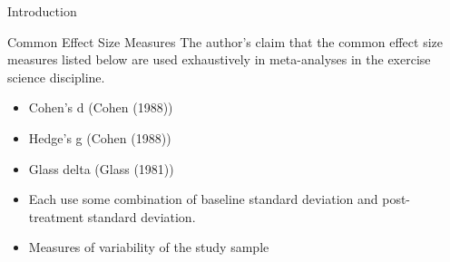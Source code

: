 \documentclass[
  ignorenonframetext,
  aspectratio=169,
]{beamer}
\begin{document}
\begin{frame}{Introduction}
\protect\hypertarget{introduction}{}
\begin{block}{Common Effect Size Measures}
\protect\hypertarget{common-effect-size-measures}{}
The author's claim that the common effect size measures listed below are
used exhaustively in meta-analyses in the exercise science discipline.

\begin{itemize}
\item
  Cohen's d (Cohen (1988))
\item
  Hedge's g (Cohen (1988))
\item
  Glass delta (Glass (1981))
\item
  Each use some combination of baseline standard deviation and
  post-treatment standard deviation.
\item
  Measures of variability of the study sample
\end{itemize}
\end{block}
\end{frame}
\end{document}

